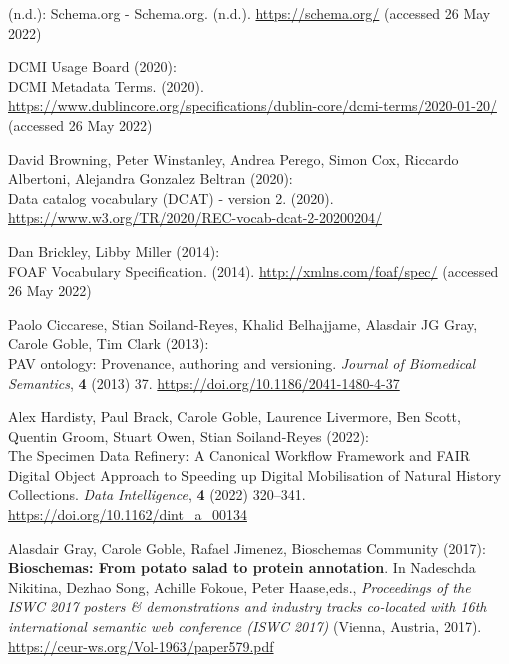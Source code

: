 \begin{thebibliography}{9}
(n.d.): Schema.org - {Schema}.org. (n.d.). \url{https://schema.org/}
(accessed 26 May 2022)

DCMI Usage Board (2020): \\
{DCMI Metadata Terms}. (2020).
\url{https://www.dublincore.org/specifications/dublin-core/dcmi-terms/2020-01-20/}
(accessed 26 May 2022)

David Browning, Peter Winstanley, Andrea Perego, Simon Cox, Riccardo
Albertoni, Alejandra Gonzalez Beltran (2020): \\
Data catalog vocabulary
({DCAT}) - version 2. (2020).
\url{https://www.w3.org/TR/2020/REC-vocab-dcat-2-20200204/}

Dan Brickley, Libby Miller (2014): \\
{FOAF Vocabulary Specification}.
(2014). \url{http://xmlns.com/foaf/spec/} (accessed 26 May 2022)

Paolo Ciccarese, Stian Soiland-Reyes, Khalid Belhajjame, Alasdair JG
Gray, Carole Goble, Tim Clark (2013): \\
{PAV} ontology: Provenance,
authoring and versioning. \emph{Journal of Biomedical Semantics},
\textbf{4} (2013) 37.
\url{https://doi.org/10.1186/2041-1480-4-37}

Alex Hardisty, Paul Brack, Carole Goble, Laurence Livermore, Ben Scott,
Quentin Groom, Stuart Owen, Stian Soiland-Reyes (2022): \\
The {Specimen
Data Refinery}: {A Canonical Workflow Framework} and {FAIR} {Digital
Object Approach} to {Speeding} up {Digital Mobilisation} of {Natural
History} {Collections}. \emph{Data Intelligence}, \textbf{4} (2022)
320--341.
\url{https://doi.org/10.1162/dint_a_00134}

Alasdair Gray, Carole Goble, Rafael Jimenez, Bioschemas Community
(2017): \\
\textbf{Bioschemas: From potato salad to protein annotation}. In
Nadeschda Nikitina, Dezhao Song, Achille Fokoue, Peter Haase,eds.,
\emph{Proceedings of the ISWC 2017 posters \& demonstrations and
industry tracks co-located with 16th international semantic web
conference (ISWC 2017)} (Vienna, Austria, 2017).
\url{https://ceur-ws.org/Vol-1963/paper579.pdf}


\end{thebibliography}
